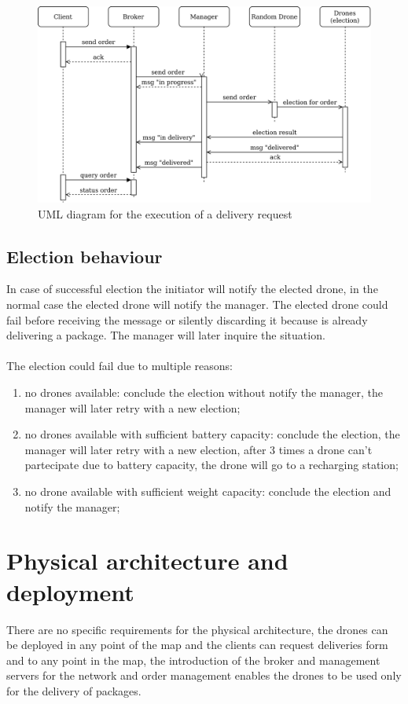 \documentclass[a4paper, oneside]{memoir}
\begin{document}
\begin{figure}[h!]
	\centering
	\includegraphics[width=\linewidth]{New-order}
	\caption{UML diagram for the execution of a delivery request}
\end{figure}

\subsection{Election behaviour}
In case of successful election the initiator will notify the elected drone, in the normal case the elected drone will notify the manager.
The elected drone could fail before receiving the message or silently discarding it because is already delivering a package. The manager will later inquire the situation.
\\\\
The election could fail due to multiple reasons:
\begin{enumerate}
	\item no drones available: conclude the election without notify the manager, the manager will later retry with a new election;
	\item no drones available with sufficient battery capacity: conclude the election, the manager will later retry with a new election, after 3 times a drone can't partecipate due to battery capacity, the drone will go to a recharging station;
	\item no drone available with sufficient weight capacity: conclude the election and notify the manager;
\end{enumerate}


\section{Physical architecture and deployment}
There are no specific requirements for the physical architecture, the drones can be deployed in any point of the map and the clients can request deliveries form and to any point in the map, the introduction of the broker and management servers for the network and order management enables the drones to be used only for the delivery of packages.
\end{document}
